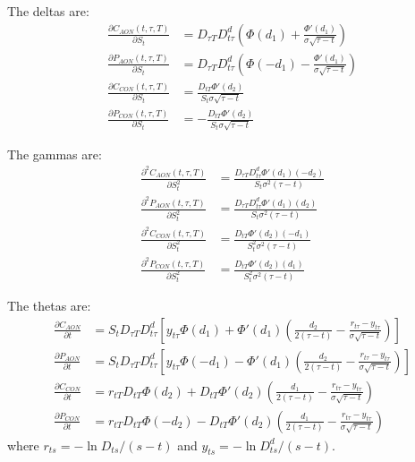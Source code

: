 The deltas are:
\begin{align}
	\frac{\partial C_{AON}(t,\tau,T)}{\partial S_t}  
  	&= D_{\tau T} D_{t\tau}^d  
	     \left( \Phi(d_1) + \frac{\Phi'(d_1)}{\sigma\sqrt{\tau-t}} \right)  \\
	\frac{\partial P_{AON}(t,\tau,T)}{\partial S_t}  
  	&= D_{\tau T} D_{t\tau}^d 
	     \left( \Phi(-d_1) - \frac{\Phi'(d_1)}{\sigma\sqrt{\tau-t}} \right)  \\
	\frac{\partial C_{CON}(t,\tau,T)}{\partial S_t}  
  	&= \frac{D_{tT} \Phi'(d_2)}{S_t \sigma\sqrt{\tau-t}}        \\
	\frac{\partial P_{CON}(t,\tau,T)}{\partial S_t}  
  	&= - \frac{D_{tT} \Phi'(d_2)}{S_t \sigma\sqrt{\tau-t}}        
\end{align}

The gammas are:
\begin{align}
	\frac{\partial^2 C_{AON}(t,\tau,T)}{\partial S_t^2}  
  	&= \frac{D_{\tau T} D_{t\tau}^d \Phi'(d_1) (-d_2)}{S_t\sigma^2 (\tau-t)}  \\
	\frac{\partial^2 P_{AON}(t,\tau,T)}{\partial S_t^2}  
  	&= \frac{D_{\tau T} D_{t\tau}^d \Phi'(d_1) (d_2)}{S_t\sigma^2 (\tau-t)}  \\
	\frac{\partial^2 C_{CON}(t,\tau,T)}{\partial S_t^2}  
  	&= \frac{D_{tT} \Phi'(d_2) (-d_1)}{S_t^2 \sigma^2(\tau-t)}  \\
	\frac{\partial^2 P_{CON}(t,\tau,T)}{\partial S_t^2}  
  	&= \frac{D_{tT} \Phi'(d_2) (d_1)}{S_t^2 \sigma^2(\tau-t)}  
\end{align}

The thetas are:
\begin{align}
	\frac{\partial C_{AON}}{\partial t} &= S_t D_{\tau T} D_{t\tau}^d 
  	\left[ y_{t\tau} \Phi(d_1) + \Phi'(d_1) 
			\left( \frac{d_2}{2(\tau-t)} - \frac{r_{t\tau}-y_{t\tau}}{\sigma\sqrt{\tau-t}} \right) 
    \right]  \\
	\frac{\partial P_{AON}}{\partial t} &= S_t D_{\tau T} D_{t\tau}^d 
		\left[ y_{t\tau} \Phi(-d_1) - \Phi'(d_1) 
			\left( \frac{d_2}{2(\tau-t)} - \frac{r_{t\tau}-y_{t\tau}}{\sigma\sqrt{\tau-t}} \right) 
    \right]  \\
	\frac{\partial C_{CON}}{\partial t}  
  	&= r_{tT} D_{tT} \Phi(d_2) + D_{tT} \Phi'(d_2) 
  	\left( \frac{d_1}{2(\tau-t)} - \frac{r_{t\tau}-y_{t\tau}}{\sigma\sqrt{\tau-t}} \right)  \\
	\frac{\partial P_{CON}}{\partial t}  
  	&= r_{tT} D_{tT} \Phi(-d_2) - D_{tT} \Phi'(d_2) 
  	\left( \frac{d_1}{2(\tau-t)} - \frac{r_{t\tau}-y_{t\tau}}{\sigma\sqrt{\tau-t}} \right)  
\end{align}
where $r_{ts}=-\ln{D_{ts}}/(s-t)$ and $y_{ts}=-\ln{D^d_{ts}}/(s-t)$.

